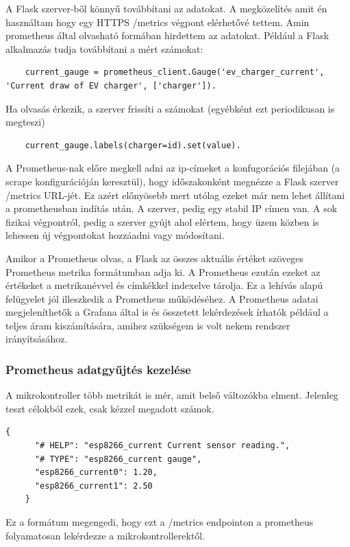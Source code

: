 A Flask szerver-ből könnyű továbbítani az adatokat. A megközelítés amit én használtam hogy egy HTTPS /metrics 
végpont elérhetővé tettem. Amin prometheus által olvasható formában hirdettem az adatokat. 
Például a Flask alkalmazás tudja továbbítani a mért számokat:
\begin{lstlisting}
    current_gauge = prometheus_client.Gauge('ev_charger_current', 'Current draw of EV charger', ['charger']). 
\end{lstlisting}

Ha olvasás érkezik, a szerver frissíti a számokat (egyébként ezt periodikusan is megteszi)
\begin{lstlisting}
    current_gauge.labels(charger=id).set(value). 
\end{lstlisting}

A Prometheus-nak előre megkell adni az ip-címeket a konfugorációs filejában
(a scrape konfigurációján keresztül), hogy időszakonként megnézze a Flask szerver 
/metrics URL-jét. 
Ez azért előnyösebb mert utólag ezeket már nem lehet állítani a prometheusban indítás után.
A szerver, pedig egy stabil IP címen van. A sok fizikai végpontról, pedig a szerver gyújt ahol elértem, hogy 
üzem közben is lehessen új végpontokat hozzáadni vagy módosítani.

Amikor a Prometheus olvas, a Flask az összes aktuális értéket szöveges 
Prometheus metrika formátumban adja ki. A Prometheus ezután ezeket az értékeket a metrikanévvel és címkékkel 
indexelve tárolja. Ez a lehívás alapú felügyelet jól illeszkedik a Prometheus működéséhez. 
A Prometheus adatai megjeleníthetők a Grafana által is és összetett lekérdezések írhatók 
például a teljes áram kiszámítására, amihez szükségem is volt nekem rendszer irányítsásához.

\subsubsection{Prometheus adatgyűjtés kezelése}

A mikrokontroller több metrikát is mér, 
amit belső változókba elment. Jelenleg teszt célokból ezek, csak kézzel megadott számok.

\begin{lstlisting}[language=HTML]
    {
      "# HELP": "esp8266_current Current sensor reading.",
      "# TYPE": "esp8266_current gauge",
      "esp8266_current0": 1.20,
      "esp8266_current1": 2.50
    }
\end{lstlisting}

Ez a formátum megengedi, hogy ezt a /metrics endpointon a prometheus folyamatosan lekérdezze a mikrokontrollerektől. \\

